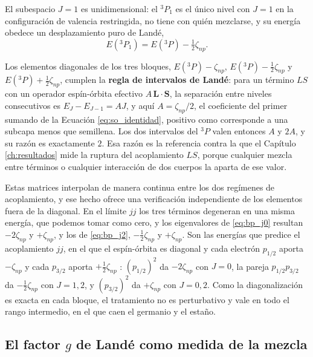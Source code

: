 El subespacio $J=1$ es unidimensional: el $^3P_1$ es el único nivel con $J=1$ en la configuración de valencia restringida, no tiene con quién mezclarse, y su energía obedece un desplazamiento puro de Landé,
\begin{equation}
    \label{eq:bp_j1}
    E(^3P_1) = E(^3P) - \tfrac{1}{2}\zeta_{np}.
\end{equation}

Los elementos diagonales de los tres bloques, $E(^3P) - \zeta_{np}$, $E(^3P) - \tfrac{1}{2}\zeta_{np}$ y $E(^3P) + \tfrac{1}{2}\zeta_{np}$, cumplen la \textbf{regla de intervalos de Landé}: para un término $LS$ con un operador espín-órbita efectivo $A\,\mathbf{L}\cdot\mathbf{S}$, la separación entre niveles consecutivos es $E_J - E_{J-1} = A J$, y aquí $A = \zeta_{np}/2$, el coeficiente del primer sumando de la Ecuación \eqref{eq:so_identidad}, positivo como corresponde a una subcapa menos que semillena. Los dos intervalos del $^3P$ valen entonces $A$ y $2A$, y su razón es exactamente $2$. Esa razón es la referencia contra la que el Capítulo \ref{ch:resultados} mide la ruptura del acoplamiento $LS$, porque cualquier mezcla entre términos o cualquier interacción de dos cuerpos la aparta de ese valor.

Estas matrices interpolan de manera continua entre los dos regímenes de acoplamiento, y ese hecho ofrece una verificación independiente de los elementos fuera de la diagonal. En el límite $jj$ los tres términos degeneran en una misma energía, que podemos tomar como cero, y los eigenvalores de \eqref{eq:bp_j0} resultan $-2\zeta_{np}$ y $+\zeta_{np}$, y los de \eqref{eq:bp_j2}, $-\tfrac{1}{2}\zeta_{np}$ y $+\zeta_{np}$. Son las energías que predice el acoplamiento $jj$, en el que el espín-órbita es diagonal y cada electrón $p_{1/2}$ aporta $-\zeta_{np}$ y cada $p_{3/2}$ aporta $+\tfrac{1}{2}\zeta_{np}$ \parencite[Sección 10-4]{Cowan1981}: $(p_{1/2})^2$ da $-2\zeta_{np}$ con $J=0$, la pareja $p_{1/2}p_{3/2}$ da $-\tfrac{1}{2}\zeta_{np}$ con $J=1,2$, y $(p_{3/2})^2$ da $+\zeta_{np}$ con $J=0,2$. Como la diagonalización es exacta en cada bloque, el tratamiento no es perturbativo y vale en todo el rango intermedio, en el que caen el germanio y el estaño.

\subsection{El factor \texorpdfstring{$g$}{g} de Landé como medida de la mezcla}
\label{sec:lande_teoria}

